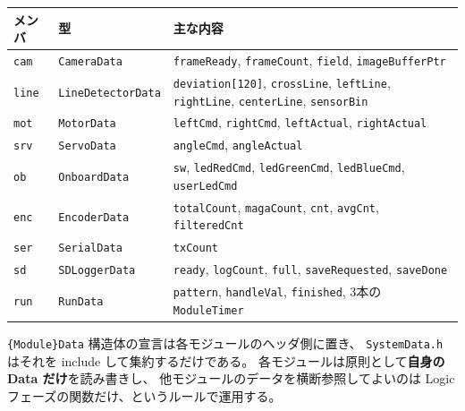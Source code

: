 \documentclass[a4paper,11pt,dvipdfmx]{jsarticle}
\begin{document}
\begin{tabularx}{\textwidth}{l l X}
\toprule
\textbf{メンバ} & \textbf{型} & \textbf{主な内容} \\
\midrule
\texttt{cam}  & \texttt{CameraData}       & \texttt{frameReady}, \texttt{frameCount}, \texttt{field}, \texttt{imageBufferPtr} \\
\texttt{line} & \texttt{LineDetectorData} & \texttt{deviation[120]}, \texttt{crossLine}, \texttt{leftLine}, \texttt{rightLine}, \texttt{centerLine}, \texttt{sensorBin} \\
\texttt{mot}  & \texttt{MotorData}        & \texttt{leftCmd}, \texttt{rightCmd}, \texttt{leftActual}, \texttt{rightActual} \\
\texttt{srv}  & \texttt{ServoData}        & \texttt{angleCmd}, \texttt{angleActual} \\
\texttt{ob}   & \texttt{OnboardData}      & \texttt{sw}, \texttt{ledRedCmd}, \texttt{ledGreenCmd}, \texttt{ledBlueCmd}, \texttt{userLedCmd} \\
\texttt{enc}  & \texttt{EncoderData}      & \texttt{totalCount}, \texttt{magaCount}, \texttt{cnt}, \texttt{avgCnt}, \texttt{filteredCnt} \\
\texttt{ser}  & \texttt{SerialData}       & \texttt{txCount} \\
\texttt{sd}   & \texttt{SDLoggerData}     & \texttt{ready}, \texttt{logCount}, \texttt{full}, \texttt{saveRequested}, \texttt{saveDone} \\
\texttt{run}  & \texttt{RunData}          & \texttt{pattern}, \texttt{handleVal}, \texttt{finished}, 3本の \texttt{ModuleTimer} \\
\bottomrule
\end{tabularx}

\begin{notebox}[データの所有権]
\texttt{\{Module\}Data} 構造体の宣言は各モジュールのヘッダ側に置き、
\texttt{SystemData.h} はそれを include して集約するだけである。
各モジュールは原則として\textbf{自身の Data だけ}を読み書きし、
他モジュールのデータを横断参照してよいのは Logic フェーズの関数だけ、というルールで運用する。
\end{notebox}
\end{document}
